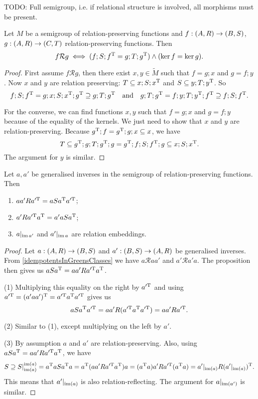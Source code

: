 TODO: Full semigroup, i.e. if relational structure is involved, all morphisms must be present.
\begin{proposition}
Let $M$ be a semigroup of relation-preserving functions and $f: \left( A, R \right) \to \left( B,S \right)$, $g: \left( A, R \right) \to \left( C,T \right)$ relation-preserving functions. Then
\[ f\mathcal{R}g \iff (f;S;f^{\mathrm{T}} = g;T;g^{\mathrm{T}})\land (\ker f = \ker g). \]
\end{proposition}
\begin{proof}
First assume $f\mathcal{R}g$, then there exist $x,y\in \tilde{M}$ such that $f = g;x$ and $g = f;y$. Now $x$ and $y$ are relation preserving: $T \subseteq x;S;x^{\mathrm{T}}$ and $S \subseteq y;T;y^{\mathrm{T}}$. So
\[ f;S;f^{\mathrm{T}} = g;x;S;x^{\mathrm{T}};g^{\mathrm{T}} \supseteq g;T;g^{\mathrm{T}} \quad\text{and}\quad g;T;g^{\mathrm{T}} = f;y;T;y^{\mathrm{T}};f^{\mathrm{T}}  \supseteq f;S;f^{\mathrm{T}}. \]

For the converse, we can find functions $x,y$ such that $f = g;x$ and $g = f;y$ because of the equality of the kernels. We just need to show that $x$ and $y$ are relation-preserving. Because $g^{\mathrm{T}};f = g^{\mathrm{T}};g;x \subseteq x$, we have
\[ T \subseteq g^{\mathrm{T}};g;T;g^{\mathrm{T}};g = g^{\mathrm{T}};f;S;f^{\mathrm{T}};g \subseteq x;S;x^{\mathrm{T}}. \]
The argument for $y$ is similar.
\end{proof}
\begin{corollary} \label{relationPreservingGeneralisedInversesEmbeddings}
Let $a,a'$ be generalised inverses in the semigroup of relation-preserving functions. Then
\begin{enumerate}
\item $aa'R a^{\prime\mathrm{T}} = aSa^{\mathrm{T}} a^{\prime\mathrm{T}}$;
\item $a'R a^{\prime\mathrm{T}}a^{\mathrm{T}} = a'aSa^{\mathrm{T}}$;
\item $a|_{\operatorname{im} a'}$ and $a'|_{\operatorname{im} a}$ are relation embeddings.
\end{enumerate}
\end{corollary}
\begin{proof}
Let $a: \left( A,R \right) \to \left( B,S \right)$ and $a': \left( B,S \right) \to \left( A,R \right)$ be generalised inverses. From \ref{idempotentsInGreensClasses} we have $a\mathcal{R}aa'$ and $a'\mathcal{R}a'a$. The proposition then gives us $aSa^{\mathrm{T}} = aa'Ra^{\prime\mathrm{T}} a^{\mathrm{T}}$.

(1) Multiplying this equality on the right by $a^{\prime\mathrm{T}}$ and using $a^{\prime\mathrm{T}} = (a'aa')^{\mathrm{T}} = a^{\prime\mathrm{T}} a^{\mathrm{T}} a^{\prime\mathrm{T}}$ gives us
\[ aSa^{\mathrm{T}} a^{\prime\mathrm{T}} = aa'R(a^{\prime\mathrm{T}} a^{\mathrm{T}} a^{\prime\mathrm{T}}) = aa'Ra^{\prime\mathrm{T}}. \]

(2) Similar to (1), except multiplying on the left by $a'$.

(3) By assumption $a$ and $a'$ are relation-preserving. Also, using $aSa^{\mathrm{T}} = aa'Ra^{\prime\mathrm{T}} a^{\mathrm{T}}$, we have
\[ S \supseteq S|_{\operatorname{im}(a)}^{\operatorname{im}(a)} = a^{\mathrm{T}} aSa^{\mathrm{T}} a = a^{\mathrm{T}} (aa'Ra^{\prime\mathrm{T}} a^{\mathrm{T}}) a = (a^{\mathrm{T}} a)a'Ra^{\prime\mathrm{T}} (a^{\mathrm{T}} a) = a'|_{\operatorname{im}(a)}R(a'|_{\operatorname{im}(a)})^{\mathrm{T}}. \]
This means that $a'|_{\operatorname{im}(a)}$ is also relation-reflecting. The argument for $a|_{\operatorname{im}(a')}$ is similar.
\end{proof}


